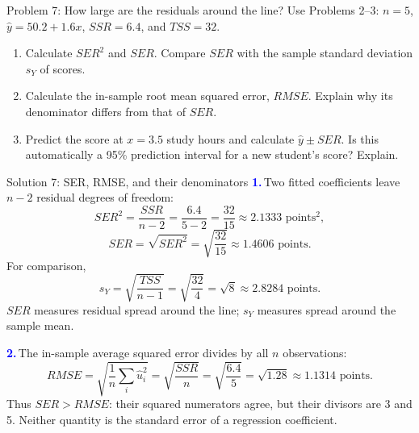 \documentclass[notes,10pt, aspectratio=169]{beamer}
\newif\ifshowsolutions
\newcommand{\answerpart}[1]{\textcolor{blue}{\textbf{#1.}}\,}
\begin{document}
\begin{frame}{Problem 7: How large are the residuals around the line?}
Use Problems 2--3: $n=5$, $\widehat y=50.2+1.6x$, $SSR=6.4$, and $TSS=32$.
\begin{enumerate}
\setlength{\itemsep}{12pt}
\item Calculate $SER^2$ and $SER$. Compare $SER$ with the sample standard deviation $s_Y$ of scores.
\item Calculate the in-sample root mean squared error, $RMSE$. Explain why its denominator differs from that of $SER$.
\item Predict the score at $x=3.5$ study hours and calculate $\widehat y\pm SER$. Is this automatically a 95\% prediction interval for a new student's score? Explain.
\end{enumerate}
\end{frame}

\ifshowsolutions
\begin{frame}{Solution 7: SER, RMSE, and their denominators}
\small
\answerpart{1}Two fitted coefficients leave $n-2$ residual degrees of freedom:
\[
SER^2=\frac{SSR}{n-2}=\frac{6.4}{5-2}=\frac{32}{15}\approx2.1333\text{ points}^2,
\]
\[
SER=\sqrt{SER^2}=\sqrt{\frac{32}{15}}\approx\boxed{1.4606\text{ points}}.
\]
For comparison,
\[
s_Y=\sqrt{\frac{TSS}{n-1}}=\sqrt{\frac{32}{4}}=\sqrt8\approx2.8284\text{ points}.
\]
$SER$ measures residual spread around the line; $s_Y$ measures spread around the sample mean.
\par\vspace{5pt}
\answerpart{2}The in-sample average squared error divides by all $n$ observations:
\[
RMSE=\sqrt{\frac1n\sum_i\widehat u_i^2}
=\sqrt{\frac{SSR}{n}}=\sqrt{\frac{6.4}{5}}=\sqrt{1.28}\approx\boxed{1.1314\text{ points}}.
\]
Thus $SER>RMSE$: their squared numerators agree, but their divisors are 3 and 5. Neither quantity is the standard error of a regression coefficient.
\end{frame}
\end{document}
